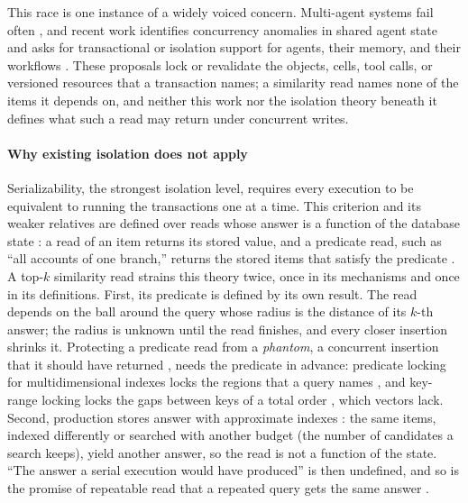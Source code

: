 \documentclass[sigconf, nonacm, review]{acmart}
\begin{document}
This race is one instance of a widely voiced concern. Multi-agent
systems fail often \cite{DBLP:conf/nips/CemriPYACTKPKRZGS25}, and
recent work identifies concurrency anomalies in shared agent state
\cite{DBLP:journals/corr/abs-2608-18092,DBLP:journals/corr/abs-2610-03140,DBLP:journals/corr/abs-2606-15376,DBLP:journals/corr/abs-2605-17076,DBLP:journals/corr/abs-2607-23929}
and asks for transactional or isolation support for agents, their
memory, and their workflows
\cite{DBLP:journals/corr/abs-2608-05412,DBLP:journals/corr/abs-2608-13900,DBLP:conf/cidr/LiuPSZZACSYSZCCGP26}.
These proposals lock or revalidate the objects, cells, tool calls, or
versioned resources that a transaction names; a similarity read names
none of the items it depends on, and neither this work nor the
isolation theory beneath it defines what such a read may return under
concurrent writes.

\paragraph{Why existing isolation does not apply}
Serializability, the strongest isolation level, requires every
execution to be equivalent to running the transactions one at a time.
This criterion and its weaker relatives are defined over reads whose
answer is a function of the database state
\cite{DBLP:journals/cacm/EswaranGLT76,DBLP:journals/jacm/Papadimitriou79,DBLP:books/aw/BernsteinHG87,DBLP:conf/sigmod/BerensonBGMOO95,DBLP:conf/icde/AdyaLO00,DBLP:conf/podc/CrooksPAC17}:
a read of an item returns its stored value, and a predicate read, such
as ``all accounts of one branch,'' returns the stored items that satisfy
the predicate \cite{DBLP:journals/tods/FeketeLOOS05}. A top-$k$
similarity read strains this theory twice, once in its mechanisms and
once in its definitions. First, its predicate is defined by its own
result. The read depends on the ball around the query whose radius is
the distance of its $k$-th answer; the radius is unknown until the read
finishes, and every closer insertion shrinks it. Protecting a predicate
read from a \emph{phantom}, a concurrent insertion that it should have
returned \cite{DBLP:journals/cacm/EswaranGLT76}, needs the predicate in
advance: predicate locking for multidimensional indexes locks the
regions that a query names
\cite{DBLP:conf/sigmod/KornackerMH97,DBLP:conf/icde/ChakrabartiM98,DBLP:conf/sigmod/ChakrabartiM99,DBLP:conf/dasfaa/SongLKY05},
and key-range locking locks the gaps between keys of a total order
\cite{DBLP:conf/vldb/Mohan90,DBLP:conf/vldb/Lomet93,DBLP:journals/tods/Graefe10},
which vectors lack. Second, production stores answer with approximate
indexes
\cite{DBLP:journals/pami/MalkovY20,DBLP:conf/nips/SubramanyaDSKK19,DBLP:journals/pami/JegouDS11}:
the same items, indexed differently or searched with another budget
(the number of candidates a search keeps), yield another answer,
so the read is not a function of the state. ``The answer a
serial execution would have produced'' is then undefined, and so is the
promise of repeatable read that a repeated query gets the
same answer \cite{DBLP:conf/vldb/Mohan90}.
\end{document}
